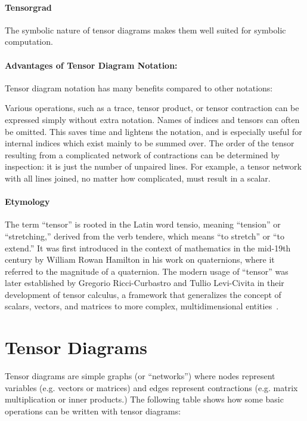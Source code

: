 \paragraph{Tensorgrad}
The symbolic nature of tensor diagrams makes them well suited for symbolic computation.

\paragraph{Advantages of Tensor Diagram Notation:}
Tensor diagram notation has many benefits compared to other notations:

Various operations, such as a trace, tensor product, or tensor contraction can be expressed simply without extra notation.
Names of indices and tensors can often be omitted. This saves time and lightens the notation, and is especially useful for internal indices which exist mainly to be summed over.
The order of the tensor resulting from a complicated network of contractions can be determined by inspection: it is just the number of unpaired lines. For example, a tensor network with all lines joined, no matter how complicated, must result in a scalar.


\paragraph{Etymology}
The term ``tensor'' is rooted in the Latin word tensio, meaning ``tension'' or ``stretching,'' derived from the verb tendere, which means ``to stretch'' or ``to extend.''
It was first introduced in the context of mathematics in the mid-19th century by William Rowan Hamilton in his work on quaternions, where it referred to the magnitude of a quaternion.
The modern usage of ``tensor'' was later established by Gregorio Ricci-Curbastro and Tullio Levi-Civita in their development of tensor calculus, a framework that generalizes the concept of scalars, vectors, and matrices to more complex, multidimensional entities~\cite{tensor_etymology_russo, hamilton_tensor}.


\tableofcontents
\clearpage


\section{Tensor Diagrams}
Tensor diagrams are simple graphs (or ``networks'') where
nodes represent variables (e.g. vectors or matrices) and edges represent
contractions (e.g. matrix multiplication or inner products.)
The following table shows how some basic operations can be written with tensor diagrams:


